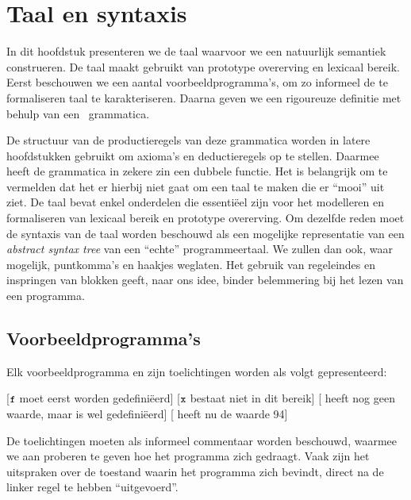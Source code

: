 
\chapter{Taal en syntaxis}

In dit hoofdstuk presenteren we de taal waarvoor we een natuurlijk semantiek construeren. De taal maakt gebruikt van prototype overerving en lexicaal bereik. Eerst beschouwen we een aantal voorbeeldprogramma's, om zo informeel de te formaliseren taal te karakteriseren. Daarna geven we een rigoureuze definitie met behulp van een \BNF\ grammatica.

De structuur van de productieregels van deze grammatica worden in latere hoofdstukken gebruikt om axioma's en deductieregels op te stellen. Daarmee heeft de grammatica in zekere zin een dubbele functie.
Het is belangrijk om te vermelden dat het er hierbij niet gaat om een taal te maken die er “mooi” uit ziet. De taal bevat enkel onderdelen die essentiëel zijn voor het modelleren en formaliseren van lexicaal bereik en prototype overerving. Om dezelfde reden moet de syntaxis van de taal worden beschouwd als een mogelijke representatie van een \emph{abstract syntax tree} van een “echte” programmeertaal. We zullen dan ook, waar mogelijk, puntkomma's en haakjes weglaten. Het gebruik van regeleindes en inspringen van blokken geeft, naar ons idee, binder belemmering bij het lezen van een programma.

\section{Voorbeeldprogramma's}
\label{sec:voorbeelden}

Elk voorbeeldprogramma en zijn toelichtingen worden als volgt gepresenteerd:

\begin{NoBreak}
\codeFragmentCaption
\begin{codelines}
  [$\text{\ttfamily\small\upshape f}$ moet eerst worden gedefiniëerd]
  \codeLine{}[$\text{\ttfamily\small\upshape x}$ bestaat niet in dit bereik]
  [ heeft nog geen waarde, maar is wel gedefiniëerd]
  [ heeft nu de waarde 94]
\end{codelines}
\end{NoBreak}

De toelichtingen moeten als informeel commentaar worden beschouwd, waarmee we aan proberen te geven hoe het programma zich gedraagt. Vaak zijn het uitspraken over de toestand waarin het programma zich bevindt, direct na de linker regel te hebben “uitgevoerd”.

